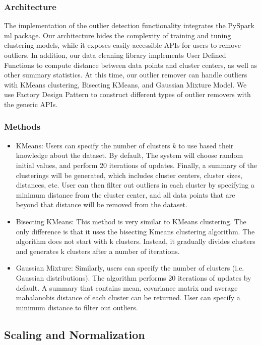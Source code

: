 \documentclass[sigconf]{acmart}
\begin{document}
\subsubsection{Architecture}
The implementation of the outlier detection functionality integrates the PySpark ml package. Our architecture hides the complexity of training and tuning clustering models, while it exposes easily accessible APIs for users to remove outliers. In addition, our data cleaning library implements User Defined Functions to compute distance between data points and cluster centers, as well as other summary statistics. At this time, our outlier remover can handle outliers with KMeans clustering, Bisecting KMeans, and Gaussian Mixture Model. We use Factory Design Pattern to construct different types of outlier removers with the generic APIs.

\subsubsection{Methods}
\begin{itemize}
	\item{KMeans}\cite{KMeans}: Users can specify the number of clusters $k$ to use based their knowledge about the dataset. By default, The system will choose random initial values, and perform 20 iterations of updates. Finally, a summary of the clusterings will be generated, which includes cluster centers, cluster sizes, distances, etc. User can then filter out outliers in each cluster by specifying a minimum distance from the cluster center, and all data points that are beyond that distance will be removed from the dataset.
	\item{Bisecting KMeans}: This method is very similar to KMeans clustering. The only difference is that it uses the bisecting Kmeans clustering algorithm. The algorithm does not start with k clusters. Instead, it gradually divides clusters and generates k clusters after a number of iterations.
	\item{Gaussian Mixture}: Similarly, users can specify the number of clusters (i.e. Gaussian distributions). The algorithm performs 20 iterations of updates by default. A summary that contains mean, covariance matrix and average mahalanobis distance of each cluster can be returned. User can specify a minimum distance to filter out outliers.

\end{itemize}

\subsection{Scaling and Normalization}
\end{document}
